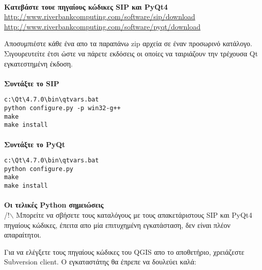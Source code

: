 \paragraph{}\textbf{Κατεβάστε τουε πηγαίους κώδικες SIP και PyQt4}\\

\url{http://www.riverbankcomputing.com/software/sip/download}
\url{http://www.riverbankcomputing.com/software/pyqt/download}

Αποσυμπιέστε κάθε ένα απο τα παραπάνω zip αρχεία σε έναν προσωρινό κατάλογο. Σιγουρευτείτε έτσι ώστε να πάρετε εκδόσεις οι οποίες να ταιριάζουν την τρέχουσα Qt εγκατεστημένη έκδοση.

\paragraph{}\textbf{Συντάξτε το SIP}\\

\begin{verbatim}
c:\Qt\4.7.0\bin\qtvars.bat 
python configure.py -p win32-g++ 
make 
make install 
\end{verbatim}

\paragraph{}\textbf{Συντάξτε το PyQt}\\

\begin{verbatim}
c:\Qt\4.7.0\bin\qtvars.bat 
python configure.py 
make 
make install 
\end{verbatim}

\paragraph{}\textbf{Οι τελικές Python σημειώσεις}\\

/!$\backslash$ Μπορείτε να σβήσετε τους καταλόγους με τους απακετάριστους SIP και PyQt4 πηγαίους κώδικες, έπειτα απο μία επιτυχημένη εγκατάσταση, δεν είναι πλέον απαραίτητοι.

Για να ελέγξετε τους πηγαίους κώδικες του QGIS απο το αποθετήριο, χρειάζεστε Subversion client. O εγκαταστάτης θα έπρεπε να δουλεύει καλά:


